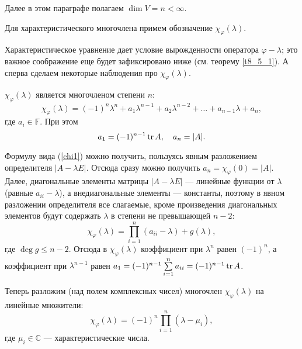 Далее в этом параграфе полагаем $\dim V = n<\infty$.


Для характеристического многочлена примем обозначение $\chi_{\varphi}(\lambda)$.


Характеристическое уравнение 
дает условие вырожденности оператора $\varphi - \lambda$; это важное 
соображение еще будет зафиксировано ниже (см. теорему \ref{t8_5_1}).
А сперва сделаем некоторые наблюдения про $\chi_{\varphi}(\lambda)$.

\begin{predl}\label{p8_5_0000}
$\chi_{\varphi}(\lambda)$ является многочленом степени $n$:
\begin{equation}\label{chi1}
\chi_{\varphi}(\lambda) = (-1)^n\lambda ^n +a_1 \lambda ^{n-1} + a_2 \lambda ^{n-2} + \ldots +
a_{n-1} \lambda + a_n,
\end{equation}
где $a_i\in \mathbb{F}$.
При этом $$a_1 = (-1)^{n-1} \mathop{\rm tr}\nolimits A, \,\,\,\,\,\,   a_n = |A|.$$
\end{predl}
\dok 
Формулу вида (\ref{chi1}) можно получить, пользуясь явным разложением определителя $|A-\lambda E|$.
Отсюда сразу можно получить  $a_n = \chi_{\varphi}(0) = |A|$.\\
Далее, диагональные элементы матрицы $|A-\lambda E|$ --- линейные функции от $\lambda $
(равные $a_{ii}-\lambda$), а внедиагональные элементы --- константы, 
поэтому в явном разложении определителя все слагаемые, кроме произведения диагональных элементов 
будут содержать $\lambda $  в степени не превышающей $n-2$:\\ 
$$\chi_{\varphi}(\lambda) = \prod\limits_{i=1}^n (a_{ii}-\lambda) + g(\lambda), $$
где $\deg g\leq n-2$. Отсюда в $\chi_{\varphi}(\lambda)$ коэффициент  при $\lambda ^n$ 
равен $(-1)^n$, а коэффициент при $\lambda ^{n-1}$ равен $a_1 = (-1)^{n-1} \sum\limits_{i=1}^n a_{ii} =
(-1)^{n-1} \mathop{\rm tr}\nolimits A$. 
\edok

\otstup

Теперь разложим (над полем комплексных чисел) многочлен $\chi_{\varphi}(\lambda)$
на линейные множители:
\begin{equation}\label{chi2}
\chi_{\varphi}(\lambda) = (-1)^n \prod\limits_{i=1}^n (\lambda - \mu _i),
\end{equation}
где $\mu_i\in \mathbb{C}$ --- характеристические числа.

